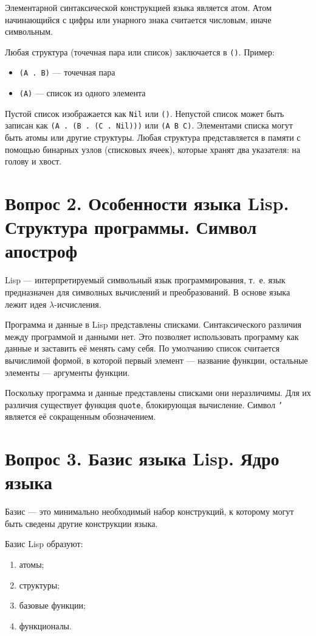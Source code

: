 Элементарной синтаксической конструкцией языка является атом. Атом начинающийся с цифры или унарного знака считается числовым, иначе символьным. 

Любая структура (точечная пара или список) заключается в {\texttt{()}}. Пример:
\begin{itemize}[label=---]
	\item {\texttt{(A . B)}} --- точечная пара
	\item {\texttt{(A)}} --- список из одного элемента
\end{itemize}
Пустой список изображается как {\texttt{Nil}} или {\texttt{()}}. Непустой список может быть записан как {\texttt{(A . (B . (C . Nil)))}} или {\texttt{(A B C)}}. Элементами списка могут быть атомы или другие структуры. Любая структура представляется в памяти с помощью бинарных узлов (списковых ячеек), которые хранят два указателя: на голову и хвост.


	
\section*{Вопрос 2. Особенности языка Lisp. Структура программы. Символ апостроф}

Lisp --- интерпретируемый символьный язык программирования, т.~е. язык предназначен для символных вычислений и преобразований. В основе языка лежит идея $\lambda$-исчисления.

Программа и данные в Lisp представлены списками. Синтаксического различия между программой и данными нет.
Это позволяет использовать программу как данные и заставить её менять саму себя.
По умолчанию список считается вычислимой формой, в которой первый элемент --- название функции, остальные элементы --- аргументы функции.

Поскольку программа и данные представлены списками они неразличимы. Для их различия существует функция {\texttt{quote}}, блокирующая вычисление. Символ {\texttt{'}} является её сокращенным обозначением.

\section*{Вопрос 3. Базис языка Lisp. Ядро языка}

Базис --- это минимально необходимый набор конструкций, к которому могут быть сведены другие конструкции языка.

Базис Lisp образуют:
\begin{enumerate}[label=\arabic*)]
	\item атомы;
	\item структуры;
	\item базовые функции;
	\item функционалы.
\end{enumerate}

